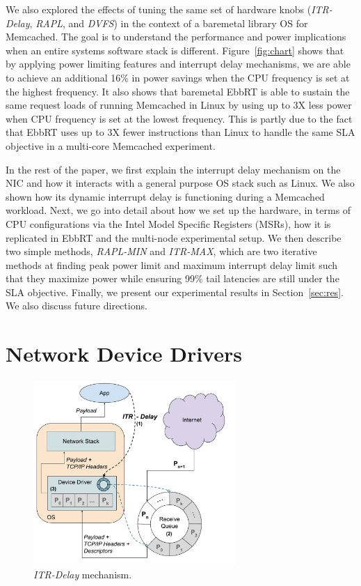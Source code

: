 \documentclass[letterpaper,twocolumn,10pt]{article}
\begin{document}
We also explored the effects of tuning the same set of hardware knobs (\textit{ITR-Delay}, \textit{RAPL}, and \textit{DVFS}) in the context of a baremetal library OS for Memcached. The goal is to understand the performance and power implications when an entire systems software stack is different. Figure~\ref{fig:chart} shows that by applying power limiting features and interrupt delay mechanisms, we are able to achieve an additional 16\% in power savings when the CPU frequency is set at the highest frequency. It also shows that baremetal EbbRT is able to sustain the same request loads of running Memcached in Linux by using up to 3X less power when CPU frequency is set at the lowest frequency. This is partly due to the fact that EbbRT uses up to 3X fewer instructions than Linux to handle the same SLA objective in a multi-core Memcached experiment. 

In the rest of the paper, we first explain the interrupt delay mechanism on the NIC and how it interacts with a general purpose OS stack such as Linux. We also shown how its dynamic interrupt delay is functioning during a Memcached workload. Next, we go into detail about how we set up the hardware, in terms of CPU configurations via the Intel Model Specific Registers (MSRs), how it is replicated in EbbRT and the multi-node experimental setup. We then describe two simple methods, \textit{RAPL-MIN} and \textit{ITR-MAX}, which are two iterative methods at finding peak power limit and maximum interrupt delay limit such that they maximize power while ensuring 99\% tail latencies are still under the SLA objective. Finally, we present our experimental results in Section~\ref{sec:res}. We also discuss future directions.

\section{Network Device Drivers}
\begin{figure}
  \includegraphics[width=7.7cm]{itr_figure.pdf}
  \caption{\textit{ITR-Delay} mechanism.}
  \label{fig:itr_figure}
\end{figure}
\end{document}

